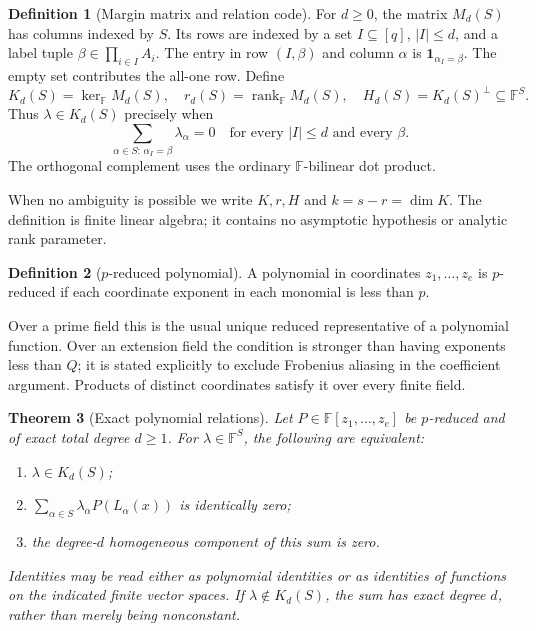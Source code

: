 \documentclass[11pt,a4paper]{article}
\numberwithin{equation}{section}
\newtheorem{theorem}{Theorem}[section]
\theoremstyle{definition}
\newtheorem{definition}[theorem]{Definition}
\theoremstyle{remark}
\newcommand{\F}{\mathbb F}
\newcommand{\1}{\mathbf 1}
\newcommand{\rank}{\operatorname{rank}}
\begin{document}
\begin{definition}[Margin matrix and relation code]
For $d\geq0$, the matrix $M_d(S)$ has columns indexed by $S$. Its rows are
indexed by a set $I\subseteq[q]$, $|I|\leq d$, and a label tuple
$\beta\in\prod_{i\in I}A_i$. The entry in row $(I,\beta)$ and column $\alpha$
is $\1_{\alpha_I=\beta}$. The empty set contributes the all-one row. Define
\begin{equation}\label{gm:eq:code}
 K_d(S)=\ker_\F M_d(S),\quad r_d(S)=\rank_\F M_d(S),\quad
 H_d(S)=K_d(S)^\perp\subseteq\F^S.
\end{equation}
Thus $\lambda\in K_d(S)$ precisely when
\begin{equation}\label{gm:eq:margins}
 \sum_{\alpha\in S:\,\alpha_I=\beta}\lambda_\alpha=0
 \quad\text{for every }|I|\leq d\text{ and every }\beta.
\end{equation}
The orthogonal complement uses the ordinary $\F$-bilinear dot product.
\end{definition}

When no ambiguity is possible we write $K,r,H$ and $k=s-r=\dim K$.
The definition is finite linear algebra; it contains no asymptotic
hypothesis or analytic rank parameter.

\begin{definition}[$p$-reduced polynomial]
A polynomial in coordinates $z_1,\ldots,z_e$ is $p$-reduced if each
coordinate exponent in each monomial is less than $p$.
\end{definition}
Over a prime field this is the usual unique reduced representative of a
polynomial function. Over an extension field the condition is stronger
than having exponents less than $Q$; it is stated explicitly to exclude
Frobenius aliasing in the coefficient argument. Products of distinct
coordinates satisfy it over every finite field.

\begin{theorem}[Exact polynomial relations]\label{gm:thm:relations}
Let $P\in\F[z_1,\ldots,z_e]$ be $p$-reduced and of exact total degree
$d\geq1$. For $\lambda\in\F^S$, the following are equivalent:
\begin{enumerate}[label=(\alph*)]
\item $\lambda\in K_d(S)$;
\item $\sum_{\alpha\in S}\lambda_\alpha P(L_\alpha(x))$ is identically zero;
\item the degree-$d$ homogeneous component of this sum is zero.
\end{enumerate}
Identities may be read either as polynomial identities or as identities
of functions on the indicated finite vector spaces. If $\lambda\notin K_d(S)$,
the sum has exact degree $d$, rather than merely being nonconstant.
\end{theorem}
\end{document}
